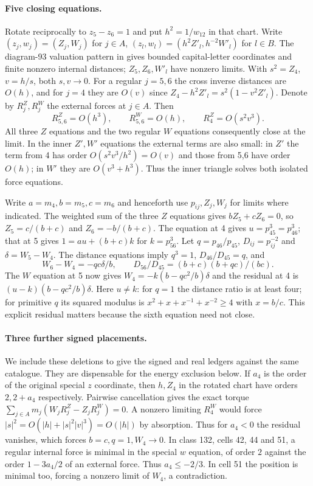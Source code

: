 \documentclass[11pt,letterpaper]{article}
\theoremstyle{definition}
\begin{document}
\paragraph{Five closing equations.}
Rotate reciprocally to $z_5-z_6=1$ and put $h^2=1/w_{12}$ in that
chart. Write $(z_j,w_j)=(Z_j,W_j)$ for $j\in A$,
$(z_l,w_l)=(h^2Z'_l,h^{-2}W'_l)$ for $l\in B$.
The diagram-93 valuation pattern in \cite[proof of Theorem 6.15]{Tomar}
gives bounded capital-letter coordinates and finite nonzero internal
distances; $Z_5,Z_6,W'_l$ have nonzero limits. With $s^2=Z_4$,
$v=h/s$, both $s,v\to0$. For a regular $j=5,6$ the cross inverse
distances are $O(h)$, and for $j=4$ they are $O(v)$ since
$Z_4-h^2Z'_l=s^2(1-v^2Z'_l)$. Denote by $R^Z_j,R^W_j$ the external
forces at $j\in A$. Then
\[
 R^Z_{5,6}=O(h^3),\qquad R^W_{5,6}=O(h),\qquad R^Z_4=O(s^2v^3).
\]
All three $Z$ equations and the two regular $W$ equations consequently
close at the limit. In the inner $Z',W'$ equations the external terms
are also small: in $Z'$ the term from 4 has order
$O(s^2v^3/h^2)=O(v)$ and those from 5,6 have order $O(h)$; in $W'$
they are $O(v^3+h^3)$. Thus the inner triangle solves both isolated
force equations.

Write $a=m_4,b=m_5,c=m_6$ and henceforth use $p_{ij},Z_j,W_j$ for
limits where indicated. The weighted sum of the three $Z$ equations
gives $bZ_5+cZ_6=0$, so $Z_5=c/(b+c)$ and $Z_6=-b/(b+c)$. The
equation at 4 gives $u=p_{45}^3=p_{46}^3$; that at 5 gives
$1=au+(b+c)k$ for $k=p_{56}^3$.
Let $q=p_{46}/p_{45}$, $D_{ij}=p_{ij}^{-2}$ and
$\delta=W_5-W_4$. The distance equations imply $q^3=1$,
$D_{46}/D_{45}=q$, and
\begin{equation}\label{br-outer}
 W_6-W_4=-qc\delta/b,\qquad
 D_{56}/D_{45}=(b+c)(b+qc)/(bc).
\end{equation}
The $W$ equation at 5 now gives $W_4=-k(b-qc^2/b)\delta$ and the
residual at 4 is $(u-k)(b-qc^2/b)\delta$. Here $u\ne k$:
for $q=1$ the distance ratio is at least four; for primitive $q$
its squared modulus is $x^2+x+x^{-1}+x^{-2}\ge4$ with $x=b/c$.
This explicit residual matters because the sixth equation need not
close.

\paragraph{Three further signed placements.}
We include these deletions to give the signed and real ledgers against
the same catalogue. They are dispensable for the energy exclusion
below. If $a_4$ is the order of the original special $z$ coordinate,
then $h,Z_4$ in the rotated chart have orders $2,2+a_4$ respectively.
Pairwise cancellation gives the exact torque
$\sum_{j\in A}m_j(W_jR^Z_j-Z_jR^W_j)=0$. A nonzero limiting $R^W_4$
would force $|s|^2=O(|h|+|s|^2|v|^3)=O(|h|)$ by absorption. Thus for
$a_4<0$ the residual vanishes, which forces $b=c,q=1,W_4\to0$.
In class 132, cells 42, 44 and 51, a regular internal force is minimal
in the special $w$ equation, of order $2$ against the order
$1-3a_4/2$ of an external force. Thus $a_4\le-2/3$. In cell 51 the
position is minimal too, forcing a nonzero limit of $W_4$, a
contradiction.
\end{document}
